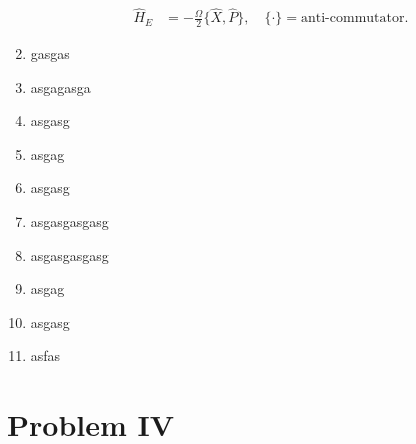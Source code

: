 \documentclass[letterpaper,11pt,twoside]{article}
\begin{document}
\begin{enumerate}[itemsep=0pt,topsep=0pt,label=\alph*)]
\begin{align*}
    \hat{H}_E&=-\frac{\Omega}{2}\{\hat{X},\hat{P}\},\quad\{\cdot\}=\text{anti-commutator}.
  \end{align*}
  \item gasgas
  \item asgagasga
  \item asgasg
  \item asgag
  \item asgasg
  \item asgasgasgasg
  \item asgasgasgasg
  \item asgag
  \item asgasg
  \item asfas
\end{enumerate}

\section*{Problem IV}
\end{document}
